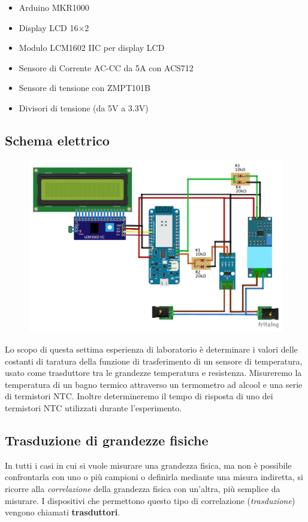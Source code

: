 \documentclass[italian,12pt,a4paper,oneside,final]{report}
\begin{document}
\begin{itemize}
\item Arduino MKR1000
\item Display LCD 16×2
\item Modulo LCM1602 IIC per display LCD
\item Sensore di Corrente AC-CC da 5A con ACS712
\item Sensore di tensione con ZMPT101B
\item Divisori di tensione (da 5V a 3.3V)
\end{itemize}


\subsection{Schema elettrico}
\begin{figure}[h]
\includegraphics[width=\textwidth]{power_meter_bb.pdf}
\centering
\end{figure}

Lo scopo di questa settima esperienza di laboratorio è determinare i valori delle costanti di taratura della funzione di trasferimento di un sensore di temperatura, usato come trasduttore tra le grandezze temperatura e resistenza.
Misureremo la temperatura di un bagno termico attraverso un termometro ad alcool e una serie di termistori NTC.
Inoltre determineremo il tempo di risposta di uno dei termistori NTC utilizzati durante l'esperimento.

\subsection{Trasduzione di grandezze fisiche}
In tutti i casi in cui si vuole misurare una grandezza fisica, ma non è possibile confrontarla con uno o più campioni o definirla mediante una misura indiretta, si ricorre alla \emph{correlazione} della grandezza fisica con un’altra, più semplice da misurare.
I dispositivi che permettono questo tipo di correlazione (\emph{trasduzione}) vengono chiamati \textbf{trasduttori}.
\end{document}
